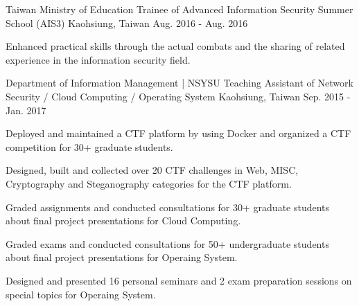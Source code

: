 \begin{cventries}

\cventry
{Taiwan Ministry of Education} %
{Trainee of Advanced Information Security Summer School (AIS3)} %
{Kaohsiung, Taiwan} %
{Aug. 2016 - Aug. 2016} %
{ %
\begin{cvitems}
\item {Enhanced practical skills through the actual combats and the sharing of related experience in the information security field.}
\end{cvitems}
}


\cventry
{Department of Information Management | NSYSU} %
{Teaching Assistant of Network Security / Cloud Computing / Operating System} %
{Kaohsiung, Taiwan} %
{Sep. 2015 - Jan. 2017} %
{ %
\begin{cvitems}
\item {Deployed and maintained a CTF platform by using Docker and organized a CTF competition for 30+ graduate students.}
\item {Designed, built and collected over 20 CTF challenges in Web, MISC, Cryptography and Steganography categories for the CTF platform.}
\item {Graded assignments and conducted consultations for 30+ graduate students about final project presentations for Cloud Computing.}
\item {Graded exams and conducted consultations for 50+ undergraduate students about final project presentations for Operaing System.}
\item {Designed and presented 16 personal seminars and 2 exam preparation sessions on special topics for Operaing System.}
\end{cvitems}
}

  
\end{cventries}
